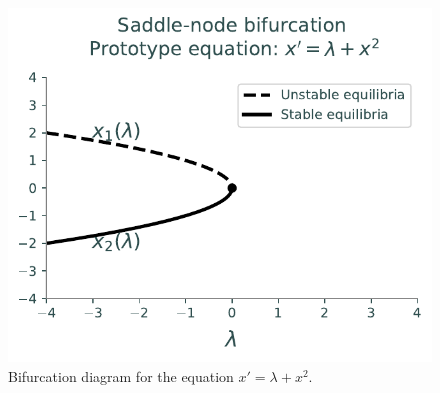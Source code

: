 \newpage
\begin{figure}
\centering
\includegraphics[width=\textwidth]{figures/SaddleNBifurcation.pdf}
\caption{Bifurcation diagram for the equation $x' = \lambda + x^2$.}
\label{bifurcation:sn}
\end{figure}

